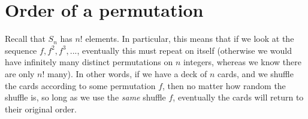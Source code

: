 \documentclass[11pt,dvipsnames]{book}
\numberwithin{equation}{section} %
\numberwithin{figure}{section} %
\numberwithin{table}{section} %
\begin{document}
%



%
%
%
%
%
%
%
%








\section{Order of a permutation}

Recall that $S_{n}$ has $n!$ elements. In particular, this means that if we look at the sequence $f,f^{2},f^{3},...$, eventually this must repeat on itself (otherwise we would have infinitely many distinct permutations on $n$ integers, whereas we know there are only $n!$ many). In other words, if we have a deck of $n$ cards, and we shuffle the cards according to some permutation $f$, then no matter how random the shuffle is, so long as we use the {\it same} shuffle $f$, eventually the cards will return to their original order. 
\end{document}
